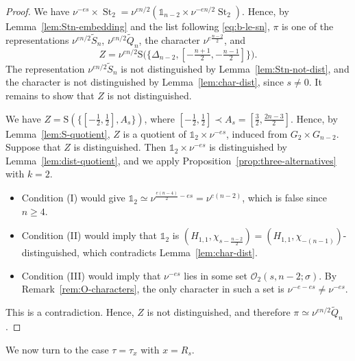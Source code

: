 \documentclass[11pt]{amsart}
\numberwithin{equation}{section}
\theoremstyle{plain}
\theoremstyle{definition}
\theoremstyle{remark}
\newcommand{\one}{\mathds{1}}
\DeclareMathOperator{\St}{St}
\newcommand{\Qt}{\widetilde{Q}}
\newcommand{\Stil}{\widetilde{S}}
\newcommand{\xitwo}{\xi^{(2)}}
\newcommand{\mm}{\mathfrak{m}}
\newcommand{\Ss}{\mathrm{S}}
\begin{document}
\begin{proof}
	We have $\nu^{-es}\times\St_2=\nu^{en/2}(\one_{n-2}\times\nu^{-en/2}\St_2)$. Hence, by Lemma~\ref{lem:Stn-embedding} and the list following \eqref{eq:b-le-sn}, $\pi$ is one of the representations $\nu^{en/2}\Stil_n$, $\nu^{en/2}\Qt_n$, the character $\nu^{e\frac{n-2}2}$, and
	$$Z=\nu^{en/2}\Ss\big(\{\Delta_{n-2},[-\tfrac{n+1}2,-\tfrac{n-1}2]\}\big).$$
	The representation $\nu^{en/2}\Stil_n$ is not distinguished by Lemma~\ref{lem:Stn-not-dist}, and the character is not distinguished by Lemma~\ref{lem:char-dist}, since $s\ne0$. It remains to show that $Z$ is not distinguished.
	
	We have $Z=\Ss(\{[-\frac12,\frac12],A_s\})$, where $[-\frac12,\frac12]\prec A_s=[\frac32,\frac{2n-3}2]$. Hence, by Lemma~\ref{lem:S-quotient}, $Z$ is a quotient of $\one_2\times\nu^{-es}$, induced from $G_2\times G_{n-2}$. Suppose that $Z$ is distinguished. Then $\one_2\times\nu^{-es}$ is distinguished by Lemma~\ref{lem:dist-quotient}, and we apply Proposition~\ref{prop:three-alternatives} with $k=2$.
	\begin{itemize}
		\item Condition (I) would give $\one_2\simeq\nu^{\frac{e(n-4)}2-es}=\nu^{e(n-2)}$, which is false since $n\ge4$.
		\item Condition (II) would imply that $\one_2$ is $(H_{1,1},\chi_{s-\frac{n-2}2})=(H_{1,1},\chi_{-(n-1)})$-distinguished, which contradicts Lemma~\ref{lem:char-dist}.
		\item Condition (III) would imply that $\nu^{-es}$ lies in some set $\mathcal O_2(s,n-2;\sigma)$. By Remark~\ref{rem:O-characters}, the only character in such a set is $\nu^{-e-es}\ne\nu^{-es}$.
	\end{itemize}
	This is a contradiction. Hence, $Z$ is not distinguished, and therefore $\pi\simeq\nu^{en/2}\Qt_n$.
\end{proof}

We now turn to the case $\tau=\tau_x$ with $x=R_s$.
\end{document}
